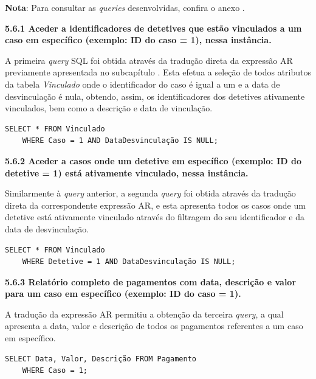 \documentclass[a4paper,12pt]{scrreprt}
\begin{document}
\textbf{Nota}: Para consultar as \textit{queries} desenvolvidas, confira o anexo \textit{}.

{\large\textbf{5.6.1 Aceder a identificadores de detetives que estão vinculados a um caso em específico (exemplo: ID do caso = 1), nessa instância.}}

A primeira \textit{query} SQL foi obtida através da tradução direta da expressão AR previamente apresentada no subcapítulo \textit{}. Esta efetua a seleção de todos atributos da tabela \textit{Vinculado} onde o identificador do caso é igual a um e a data de desvinculação é nula, obtendo, assim, os identificadores dos detetives ativamente vinculados, bem como a descrição e data de vinculação.

\vspace{0.4cm}
\begin{lstlisting}[escapechar=!]
SELECT * FROM Vinculado
	WHERE Caso = 1 AND DataDesvinculação IS NULL;
\end{lstlisting}

{\large\textbf{5.6.2 Aceder a casos onde um detetive em específico (exemplo: ID do detetive = 1) está ativamente vinculado, nessa instância.}}

Similarmente à \textit{query} anterior, a segunda \textit{query} foi obtida através da tradução direta da correspondente expressão AR, e esta apresenta todos os casos onde um detetive está ativamente vinculado através do filtragem do seu identificador e da data de desvinculação.

\vspace{0.4cm}
\begin{lstlisting}[escapechar=!]
SELECT * FROM Vinculado
	WHERE Detetive = 1 AND DataDesvinculação IS NULL;
\end{lstlisting}

{\large\textbf{5.6.3 Relatório completo de pagamentos com data, descrição e valor para um caso em específico (exemplo: ID do caso = 1).}}

A tradução da expressão AR permitiu a obtenção da terceira \textit{query}, a qual apresenta a data, valor e descrição de todos os pagamentos referentes a um caso em específico.

\vspace{0.4cm}
\begin{lstlisting}[escapechar=!]
SELECT Data, Valor, Descrição FROM Pagamento
	WHERE Caso = 1;
\end{lstlisting}

\clearpage
\end{document}
